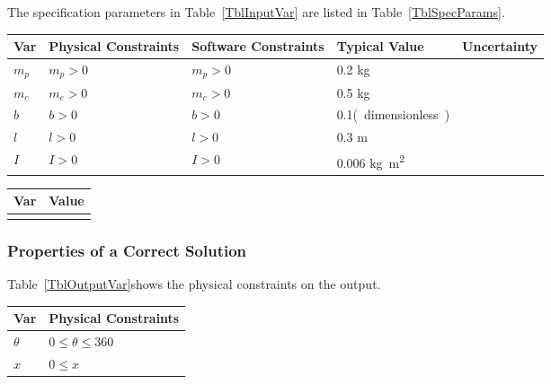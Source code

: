 \documentclass[12pt]{article}
\begin{document}
The specification parameters in Table~\ref{TblInputVar} are listed in
Table~\ref{TblSpecParams}.

\begin{table}[!h]
  \caption{Input Variables} \label{TblInputVar}
  \renewcommand{\arraystretch}{1.2}
\noindent \begin{longtable*}{l l l l c} 
  \toprule
  \textbf{Var} & \textbf{Physical Constraints} & \textbf{Software Constraints} &
                             \textbf{Typical Value} & \textbf{Uncertainty}\\
  \midrule 
  $m_p$ & $m_p > 0$ & $m_p > 0$ & 0.2 \si[per-mode=symbol] {\kilogram} &  \\
 $m_c$ & $m_c > 0$ & $m_c > 0$ & 0.5 \si[per-mode=symbol] {\kilogram} &  \\
 $b$ & $b > 0$ & $b > 0$ & 0.1\si[per-mode=symbol]  (dimensionless) &  \\
 $l$ & $l > 0$ & $l> 0$ & 0.3 \si[per-mode=symbol] {\metre} &  \\
 $I$ & $I > 0$ & $I> 0$ & 0.006 \si[per-mode=symbol] {\kilogram. \metre^2} &  \\


  \bottomrule
\end{longtable*}
\end{table}

\begin{table}[!h]
\caption{Specification Parameter Values} \label{TblSpecParams}
\renewcommand{\arraystretch}{1.2}
\noindent \begin{longtable*}{l l} 
  \toprule
  \textbf{Var} & \textbf{Value} \\
  \midrule 
   & \\
  \bottomrule
\end{longtable*}
\end{table}

\subsubsection{Properties of a Correct Solution} \label{sec_CorrectSolution}

\noindent
Table~\ref{TblOutputVar}shows the physical constraints on the output.

\begin{table}[!h]
\caption{Output Variables} \label{TblOutputVar}
\renewcommand{\arraystretch}{1.2}
\noindent \begin{longtable*}{l l} 
  \toprule
  \textbf{Var} & \textbf{Physical Constraints} \\
  \midrule 
  $\theta$ &  $0\leq \theta \leq 360$\\
 $x$ &  $ 0\leq x$ \\
  \bottomrule
\end{longtable*}
\end{table}
\end{document}
